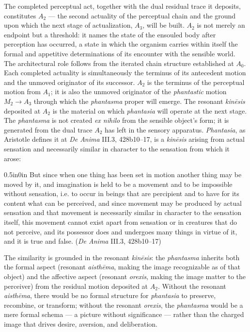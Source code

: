 The completed perceptual act, together with the dual residual trace it deposits, constitutes $A_2$ --- the second actuality of the perceptual chain and the ground upon which the next stage of actualization, $A_3$, will be built. $A_2$ is not merely an endpoint but a threshold: it names the state of the ensouled body after perception has occurred, a state in which the organism carries within itself the formal and appetitive determinations of its encounter with the sensible world. The architectural role follows from the iterated chain structure established at $A_0$. Each completed actuality is simultaneously the terminus of its antecedent motion and the unmoved originator of its successor. $A_2$ is the terminus of the perceptual motion from $A_1$; it is also the unmoved originator of the \textit{phantastic} motion $M_2 \rightarrow A_3$ through which the \textit{phantasma} proper will emerge. The resonant \textit{kinēsis} deposited at $A_2$ is the material on which \textit{phantasia} will operate at the next stage. The \textit{phantasma} is not created \textit{ex nihilo} from the sensible object's form; it is generated from the dual trace $A_2$ has left in the sensory apparatus. \textit{Phantasia}, as Aristotle defines it at \textit{De Anima} III.3, 428b10--17, is a \textit{kinēsis} arising from actual sensation and necessarily similar in character to the sensation from which it arose:
\begin{adjustwidth}{0.5in}{0in}
But since when one thing has been set in motion another thing may be moved by it, and imagination is held to be a movement and to be impossible without sensation, i.e. to occur in beings that are percipient and to have for its content what can be perceived, and since movement may be produced by actual sensation and that movement is necessarily similar in character to the sensation itself, this movement cannot exist apart from sensation or in creatures that do not perceive, and its possessor does and undergoes many things in virtue of it, and it is true and false. (\textit{De Anima} III.3, 428b10--17)
\end{adjustwidth}
The similarity is grounded in the resonant \textit{kinēsis}: the \textit{phantasma} inherits both the formal aspect (resonant \textit{aisthēma}, making the image recognizable as of that object) and the affective aspect (resonant \textit{orexis}, making the image matter to the perceiver) from the residual motion deposited at $A_2$. Without the resonant \textit{aisthēma}, there would be no formal structure for \textit{phantasia} to preserve, recombine, or transform; without the resonant \textit{orexis}, the \textit{phantasma} would be a mere formal schema --- a picture without significance --- rather than the charged image that drives desire, aversion, and deliberation.

